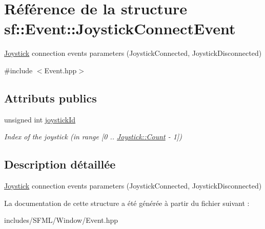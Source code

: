 \hypertarget{structsf_1_1Event_1_1JoystickConnectEvent}{}\section{Référence de la structure sf\+:\+:Event\+:\+:Joystick\+Connect\+Event}
\label{structsf_1_1Event_1_1JoystickConnectEvent}


\hyperlink{classsf_1_1Joystick}{Joystick} connection events parameters (Joystick\+Connected, Joystick\+Disconnected)  




{\ttfamily \#include $<$Event.\+hpp$>$}

\subsection*{Attributs publics}
\begin{DoxyCompactItemize}
\item 
\mbox{\label{structsf_1_1Event_1_1JoystickConnectEvent_a08e58e8559d3e4fe4654855fec79194b}} 
unsigned int \hyperlink{structsf_1_1Event_1_1JoystickConnectEvent_a08e58e8559d3e4fe4654855fec79194b}{joystick\+Id}
\begin{DoxyCompactList}\small\item\em Index of the joystick (in range \mbox{[}0 .. \hyperlink{classsf_1_1Joystick_a951a7c775921304a5f3443c6e2bb4d65a6e0a2a95bc1da277610c04d80f52715e}{Joystick\+::\+Count} -\/ 1\mbox{]}) \end{DoxyCompactList}\end{DoxyCompactItemize}


\subsection{Description détaillée}
\hyperlink{classsf_1_1Joystick}{Joystick} connection events parameters (Joystick\+Connected, Joystick\+Disconnected) 

La documentation de cette structure a été générée à partir du fichier suivant \+:\begin{DoxyCompactItemize}
\item 
includes/\+S\+F\+M\+L/\+Window/Event.\+hpp\end{DoxyCompactItemize}
